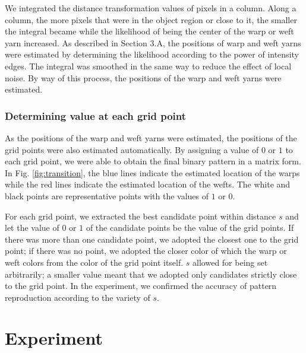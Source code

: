 We integrated the distance transformation values of pixels in a column. Along a column, the more pixels that were in the object region or close to it, the smaller the integral became while the likelihood of being the center of the warp or weft yarn increased. As described in Section 3.A, the positions of warp and weft yarns were estimated by determining the likelihood according to the power of intensity edges. The integral was smoothed in the same way to reduce the effect of local noise. By way of this process, the positions of the warp and weft yarns were estimated.  


\vspace{0.2cm}

\subsubsection{Determining value at each grid point}
As the positions of the warp and weft yarns were estimated, the positions of the grid points were also estimated automatically. By assigning a value of $0$ or $1$ to each grid point, we were able to obtain the final binary pattern in a matrix form. In Fig. \ref{fig:transition}, the blue lines indicate the estimated location of the warps while the red lines indicate the estimated location of the wefts. The white and black points are representative points with the values of $1$ or $0$.

For each grid point, we extracted the best candidate point within distance $s$ and let the value of $0$ or $1$ of the candidate points be the value of the grid points. If there was more than one candidate point, we adopted the closest one to the grid point; if there was no point, we adopted the closer color of which the warp or weft colors from the color of the grid point itself. $s$ allowed for being set arbitrarily; a smaller value meant that we adopted only candidates strictly close to the grid point. In the experiment, we confirmed the accuracy of pattern reproduction according to the variety of $s$. 

\section{Experiment}

